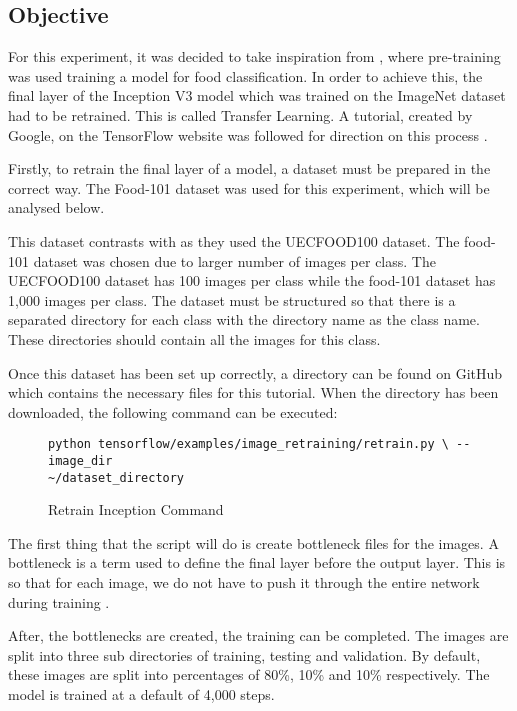 \tocless\subsection{Objective}
For this experiment, it was decided to take inspiration from
\parencite{yanaiFood}, where pre-training was used training a model for food
classification. In order to achieve this, the final layer of the
Inception V3 model which was trained on the ImageNet dataset had to be retrained. This is called
Transfer Learning.
A tutorial, created by Google, on the TensorFlow website was followed
for direction on this process \parencite{retrainInception}.

Firstly, to retrain the final layer of a model, a dataset must be
prepared in the correct way. The Food-101 dataset \parencite{food101}
was used for this experiment, which will be analysed below.

This dataset contrasts with \parencite{yanaiFood} as they used the UECFOOD100 dataset.
The food-101 dataset was chosen due to larger number of images per class.
The UECFOOD100 dataset has 100 images per class while the food-101 dataset has 1,000 images per class.
The dataset must be structured so that
there is a separated directory for each class with the directory name as the class
name. These directories should contain all the images for this class. 

Once this dataset has been set up correctly, a directory can be found on GitHub
which contains the necessary files for this tutorial. When the directory has
been downloaded, the following command can be executed:
\begin{figure}
\caption{Retrain Inception Command}
\label{lst:retrainCommand}
\begin{lstlisting}[style=Command]
python tensorflow/examples/image_retraining/retrain.py \ --image_dir
~/dataset_directory
\end{lstlisting}
\end{figure}

The first thing that the script will do is create bottleneck files for the
images. A bottleneck is a term used to define the final layer before the output
layer. This is so that for each image, we do not have to push it through the
entire network during training \parencite{retrainInception}.

After, the bottlenecks are created, the training can be completed. The images
are split into three sub directories of training, testing and validation. By
default, these images are split into percentages of 80\%, 10\% and 10\%
respectively. The model is trained at a default of 4,000 steps. 

